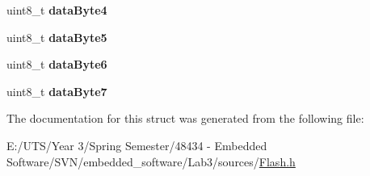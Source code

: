 \begin{DoxyCompactItemize}
\item 
\hypertarget{struct_f_c_c_o_b__t_a73047bb8576394feb76a6182006c8a0d}{}uint8\+\_\+t {\bfseries data\+Byte4}\label{struct_f_c_c_o_b__t_a73047bb8576394feb76a6182006c8a0d}

\item 
\hypertarget{struct_f_c_c_o_b__t_a20e8f021dd3fd3ed346b78524521694d}{}uint8\+\_\+t {\bfseries data\+Byte5}\label{struct_f_c_c_o_b__t_a20e8f021dd3fd3ed346b78524521694d}

\item 
\hypertarget{struct_f_c_c_o_b__t_a5a70137729ba02fc3ac5bc0bc02048aa}{}uint8\+\_\+t {\bfseries data\+Byte6}\label{struct_f_c_c_o_b__t_a5a70137729ba02fc3ac5bc0bc02048aa}

\item 
\hypertarget{struct_f_c_c_o_b__t_a9ce347f0d169a29340c6104d0369e8d3}{}uint8\+\_\+t {\bfseries data\+Byte7}\label{struct_f_c_c_o_b__t_a9ce347f0d169a29340c6104d0369e8d3}

\end{DoxyCompactItemize}


The documentation for this struct was generated from the following file\+:\begin{DoxyCompactItemize}
\item 
E\+:/\+U\+T\+S/\+Year 3/\+Spring Semester/48434 -\/ Embedded Software/\+S\+V\+N/embedded\+\_\+software/\+Lab3/sources/\hyperlink{_flash_8h}{Flash.\+h}\end{DoxyCompactItemize}
